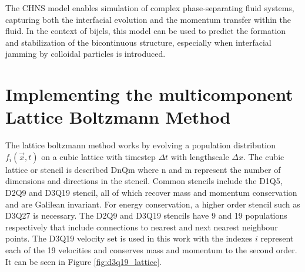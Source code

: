 The CHNS model enables simulation of complex phase-separating fluid systems, capturing both the interfacial evolution and the momentum transfer within the fluid. In the context of bijels, this 
model can be used to predict the formation and stabilization of the bicontinuous structure, especially when interfacial jamming by colloidal particles is introduced.

\section{Implementing the multicomponent Lattice Boltzmann Method} 
\label{section:lbm_hydrodynamics}

The lattice boltzmann method works by evolving a population distribution $f_{i}(\vec{x}, t)$ on a cubic lattice with 
timestep $\Delta t$ with lengthscale $\Delta x$. \cite{qian_lattice_1992, succi_lattice_2018, he_theory_1997} The cubic lattice or stencil is described
DnQm where n and m represent the number of dimensions and directions in the stencil. \cite{succi_lattice_2018, schmieschek_lb3d_2017}
Common stencils include the D1Q5, D2Q9 and D3Q19 stencil, all of which recover mass and momentum conservation and are Galilean invariant.
For energy conservation, a higher order stencil such as D3Q27 is necessary. The D2Q9 and D3Q19 stencils have 9 and 19 populations respectively that include 
connections to nearest and next nearest neighbour points. The D3Q19 
velocity set is used in this work with the indexes $i$ represent each of the 19 velocities and conserves mass and momentum 
to the second order. It can be seen in Figure \ref{fig:d3q19_lattice}. 


